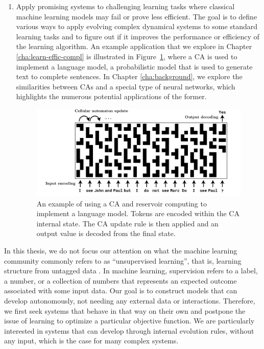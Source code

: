 \begin{enumerate}
  \item Apply promising systems to challenging learning tasks where classical
        machine learning models may fail or prove less efficient. The goal is to
        define various ways to apply evolving complex dynamical systems to some
        standard learning tasks and to figure out if it improves the performance
        or efficiency of the learning algorithm. An example application that we
        explore in Chapter \ref{cha:learn-effic-compl} is illustrated in
        Figure~\ref{fig:ca_lm}, where a \ac{CA} is used to implement a language
        model, a probabilistic model that is used to generate text to complete
        sentences. In Chapter \ref{cha:background}, we explore the similarities
        between \acp{CA} and a special type of neural networks, which highlights
        the numerous potential applications of the former.
\begin{figure}[htbp]
  \centering
  \includegraphics[width=\linewidth]{figures/ca_lm}
  \caption{An example of using a \acl{CA} and reservoir computing to implement a
    language model. Tokens are encoded within the \acl{CA} internal state. The
    \acl{CA} update rule is then applied and an output value is decoded from the
    final state.}
  \label{fig:ca_lm}
\end{figure}

\end{enumerate}

In this thesis, we do not focus our attention on what the machine learning
community commonly refers to as ``unsupervised learning'', that is, learning
structure from untagged data
\parencite{hintonUnsupervisedLearningFoundations1999}. In machine learning,
supervision refers to a label, a number, or a collection of numbers that
represents an expected outcome associated with some input data. Our goal is to
construct models that can develop autonomously, not needing any external data or
interactions. Therefore, we first seek systems that behave in that way on their
own and postpone the issue of learning to optimize a particular objective
function. We are particularly interested in systems that can develop through
internal evolution rules, without any input, which is the case for many complex
systems.

